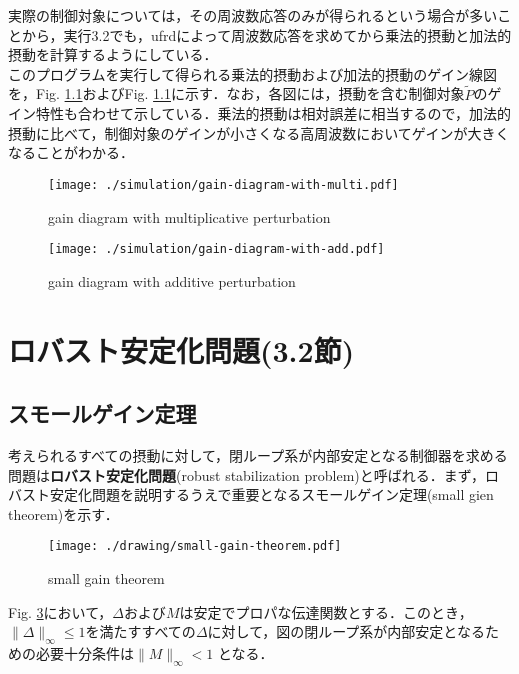\documentclass[a4paper,11pt,uplatex]{jsarticle} %
\theoremstyle{definition}	%
\newcommand{\figref}[1]{Fig. \ref{#1}}
\begin{document}
{%


実際の制御対象については，その周波数応答のみが得られるという場合が多いことから，実行3.2でも，ufrdによって周波数応答を求めてから乗法的摂動と加法的摂動を計算するようにしている．\\
このプログラムを実行して得られる乗法的摂動および加法的摂動のゲイン線図を，\figref{}および\figref{}に示す．なお，各図には，摂動を含む制御対象$\tilde{P}$のゲイン特性も合わせて示している．乗法的摂動は相対誤差に相当するので，加法的摂動に比べて，制御対象のゲインが小さくなる高周波数においてゲインが大きくなることがわかる．

\begin{figure}[t]
\centering
\texttt{[image: ./simulation/gain-diagram-with-multi.pdf]}
\caption{gain diagram with multiplicative perturbation}
\label{gain diagram with multi}
\end{figure}

\begin{figure}[t]
\centering
\texttt{[image: ./simulation/gain-diagram-with-add.pdf]}
\caption{gain diagram with additive perturbation}
\label{gain diagram with add}
\end{figure}

\section{ロバスト安定化問題(3.2節)}
\subsection{スモールゲイン定理}

考えられるすべての摂動に対して，閉ループ系が内部安定となる制御器を求める問題は\textbf{ロバスト安定化問題}(robust stabilization problem)と呼ばれる．まず，ロバスト安定化問題を説明するうえで重要となるスモールゲイン定理(small gien theorem)を示す．\\
\begin{figure}[t]
\centering
\texttt{[image: ./drawing/small-gain-theorem.pdf]}
\caption{small gain theorem}
\label{small gain theorem}
\end{figure}

\begin{tcolorbox}[title=定理3.1 スモールゲイン定理,
drop small lifted shadow=black]
\figref{small gain theorem}において，$\Delta$および$M$は安定でプロパな伝達関数とする．このとき，$\| \Delta \|_\infty \leq 1 $を満たすすべての$ \Delta $に対して，図の閉ループ系が内部安定となるための必要十分条件は$ \| M \|_\infty < 1 $ となる．
\end{tcolorbox}

}
\end{document}
